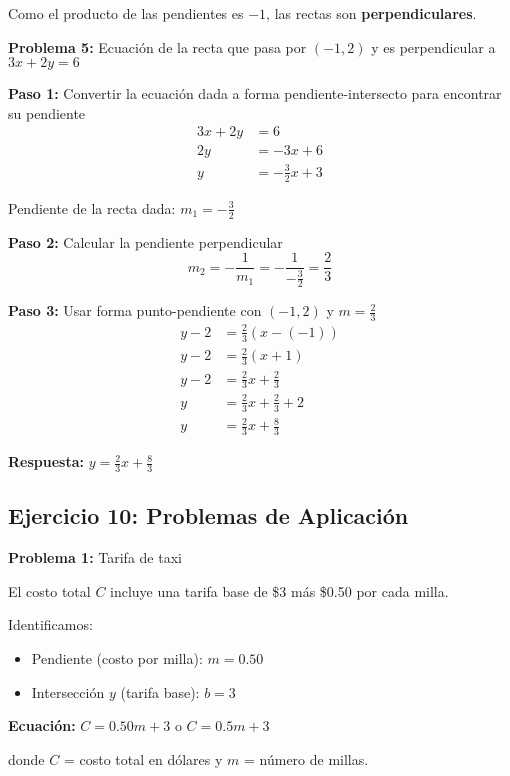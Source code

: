 Como el producto de las pendientes es $-1$, las rectas son \textbf{perpendiculares}.

\medskip

\textbf{Problema 5:} Ecuación de la recta que pasa por $(-1, 2)$ y es perpendicular a $3x + 2y = 6$

\textbf{Paso 1:} Convertir la ecuación dada a forma pendiente-intersecto para encontrar su pendiente
\begin{align*}
3x + 2y &= 6 \\
2y &= -3x + 6 \\
y &= -\frac{3}{2}x + 3
\end{align*}

Pendiente de la recta dada: $m_1 = -\frac{3}{2}$

\textbf{Paso 2:} Calcular la pendiente perpendicular
$$m_2 = -\frac{1}{m_1} = -\frac{1}{-\frac{3}{2}} = \frac{2}{3}$$

\textbf{Paso 3:} Usar forma punto-pendiente con $(-1, 2)$ y $m = \frac{2}{3}$
\begin{align*}
y - 2 &= \frac{2}{3}(x - (-1)) \\
y - 2 &= \frac{2}{3}(x + 1) \\
y - 2 &= \frac{2}{3}x + \frac{2}{3} \\
y &= \frac{2}{3}x + \frac{2}{3} + 2 \\
y &= \frac{2}{3}x + \frac{8}{3}
\end{align*}

\textbf{Respuesta:} $y = \frac{2}{3}x + \frac{8}{3}$

\newpage

\subsection*{Ejercicio 10: Problemas de Aplicación}

\textbf{Problema 1:} Tarifa de taxi

El costo total $C$ incluye una tarifa base de \$3 más \$0.50 por cada milla.

Identificamos:
\begin{itemize}
    \item Pendiente (costo por milla): $m = 0.50$
    \item Intersección $y$ (tarifa base): $b = 3$
\end{itemize}

\textbf{Ecuación:} $C = 0.50m + 3$ o $C = 0.5m + 3$

donde $C$ = costo total en dólares y $m$ = número de millas.

